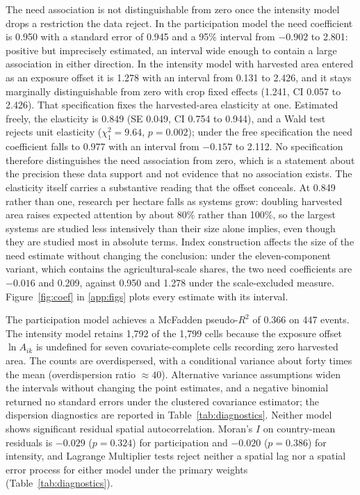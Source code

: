 \documentclass[ASNA,twocolumn]{USG}
\begin{document}
The need association is not distinguishable from zero once the intensity model drops a
restriction the data reject. In the participation model the need coefficient is 0.950 with a
standard error of 0.945 and a 95\% interval from $-0.902$ to 2.801: positive but imprecisely
estimated, an interval wide enough to contain a large association in either direction. In the
intensity model with harvested area entered as an exposure offset it is 1.278 with an interval
from 0.131 to 2.426, and it stays marginally distinguishable from zero with crop fixed effects
(1.241, CI 0.057 to 2.426). That specification fixes the harvested-area elasticity at one.
Estimated freely, the elasticity is 0.849 (SE 0.049, CI 0.754 to 0.944), and a Wald test rejects
unit elasticity ($\chi^{2}_{1} = 9.64$, $p = 0.002$); under the free specification the need
coefficient falls to 0.977 with an interval from $-0.157$ to 2.112. No specification therefore
distinguishes the need association from zero, which is a statement about the precision these data
support and not evidence that no association exists. The elasticity itself carries a substantive
reading that the offset conceals. At 0.849 rather than one, research per hectare falls as systems
grow: doubling harvested area raises expected attention by about 80\% rather than 100\%, so the
largest systems are studied less intensively than their size alone implies, even though they are
studied most in absolute terms. Index construction affects the size of the need estimate without
changing the conclusion: under the eleven-component variant, which contains the agricultural-scale
shares, the two need coefficients are $-0.016$ and 0.209, against 0.950 and 1.278 under the
scale-excluded measure.
Figure~\ref{fig:coef} in \ref{app:figs} plots every estimate with its interval.

The participation model achieves a McFadden pseudo-$R^{2}$ of 0.366 on 447 events. The
intensity model retains 1,792 of the 1,799 cells because the exposure offset $\ln A_{ik}$ is
undefined for seven covariate-complete cells recording zero harvested area. The counts are overdispersed, with a conditional variance about forty times the mean
(overdispersion ratio $\approx 40$). Alternative variance assumptions widen the intervals without
changing the point estimates, and a negative binomial returned no standard errors under the
clustered covariance estimator; the dispersion diagnostics are reported in
Table~\ref{tab:diagnostics}. Neither model shows significant residual spatial autocorrelation. Moran's $I$ on country-mean
residuals is $-0.029$ ($p = 0.324$) for participation and $-0.020$ ($p = 0.386$) for intensity,
and Lagrange Multiplier tests reject neither a spatial lag nor a spatial error process for either
model under the primary weights (Table~\ref{tab:diagnostics}).
\end{document}
